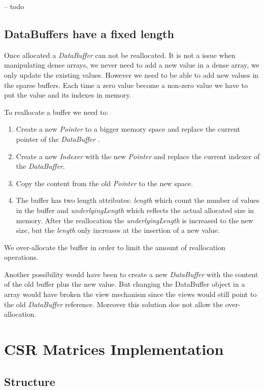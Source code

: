 -- todo


\subsection{DataBuffers have a fixed length}

Once allocated a \textit{DataBuffer} can not be reallocated. It is not a issue when manipulating dense arrays, we never need to add a new value in a dense array, we only update the existing values. However we need to be able to add new values in the sparse buffers. Each time a zero value become a non-zero value we have to put the value and its indexes in memory.

To reallocate a buffer we need to:
\begin{enumerate}
	\item Create a new \textit{Pointer} to a bigger memory space and replace the current pointer of the \textit{DataBuffer} .
	\item Create a new \textit{Indexer} with the new \textit{Pointer} and replace the current indexer of the \textit{DataBuffer}.
	\item Copy the content from the old \textit{Pointer} to the new space.
	\item The buffer has two length attributes: \textit{length} which count the number of values in the buffer and \textit{underlyingLength} which reflects the actual allocated size in memory. After the reallocation the \textit{underlyingLength} is increased to the new size, but the \textit{length} only increases at the insertion of a new value.
\end{enumerate}

We over-allocate the buffer in order to limit the amount of reallocation operations. 

Another possibility would have been to create a new \textit{DataBuffer} with the content of the old buffer plus the new value. But changing the DataBuffer object in a array would have broken the view mechanism since the views would still point to the old \textit{DataBuffer} reference. Moreover this solution doe not allow the over-allocation.


\section{CSR Matrices Implementation}
\subsection{Structure}

